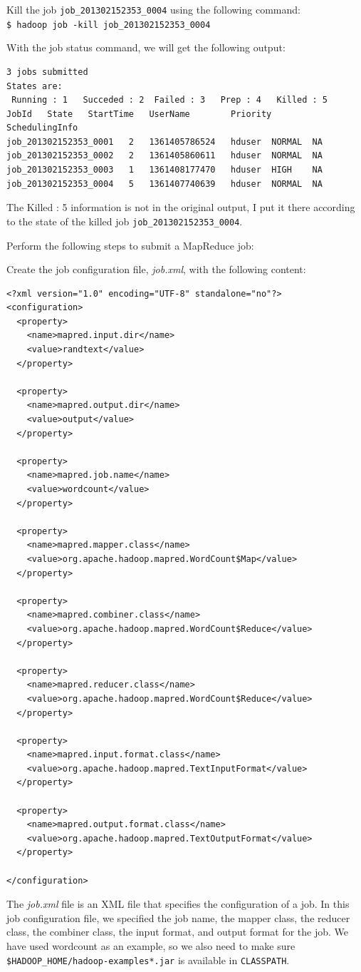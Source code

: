 Kill the job \verb|job_201302152353_0004| using the following command: \\
\verb|$ hadoop job -kill job_201302152353_0004|

With the job status command, we will get the following output:
\lstset{style=bashstyle}
\begin{lstlisting}
3 jobs submitted
States are:
 Running : 1   Succeded : 2  Failed : 3   Prep : 4   Killed : 5
JobId   State   StartTime   UserName        Priority        SchedulingInfo
job_201302152353_0001   2   1361405786524   hduser  NORMAL  NA
job_201302152353_0002   2   1361405860611   hduser  NORMAL  NA
job_201302152353_0003   1   1361408177470   hduser  HIGH    NA
job_201302152353_0004   5   1361407740639   hduser  NORMAL  NA
\end{lstlisting}

\begin{info}
The Killed : 5 information is not in the original output, I put it there according to the state of the killed job \verb|job_201302152353_0004|.
\end{info}

Perform the following steps to submit a MapReduce job:

Create the job configuration file, \emph{job.xml}, with the following content:
\lstset{style=bashstyle}
\begin{lstlisting}
<?xml version="1.0" encoding="UTF-8" standalone="no"?>
<configuration>
  <property>
    <name>mapred.input.dir</name>
    <value>randtext</value>
  </property>

  <property>
    <name>mapred.output.dir</name>
    <value>output</value>
  </property>

  <property>
    <name>mapred.job.name</name>
    <value>wordcount</value>
  </property>

  <property>
    <name>mapred.mapper.class</name>
    <value>org.apache.hadoop.mapred.WordCount$Map</value>
  </property>

  <property>
    <name>mapred.combiner.class</name>
    <value>org.apache.hadoop.mapred.WordCount$Reduce</value>
  </property>

  <property>
    <name>mapred.reducer.class</name>
    <value>org.apache.hadoop.mapred.WordCount$Reduce</value>
  </property>

  <property>
    <name>mapred.input.format.class</name>
    <value>org.apache.hadoop.mapred.TextInputFormat</value>
  </property>

  <property>
    <name>mapred.output.format.class</name>
    <value>org.apache.hadoop.mapred.TextOutputFormat</value>
  </property>

</configuration>
\end{lstlisting}
The \emph{job.xml} file is an XML file that specifies the configuration of a job. In this job configuration file, we specified the job name, the mapper class, the reducer class, the combiner class, the input format, and output format for the job. We have used wordcount as an example, so we also need to make sure \verb|$HADOOP_HOME/hadoop-examples*.jar| is available in \verb|CLASSPATH|.

